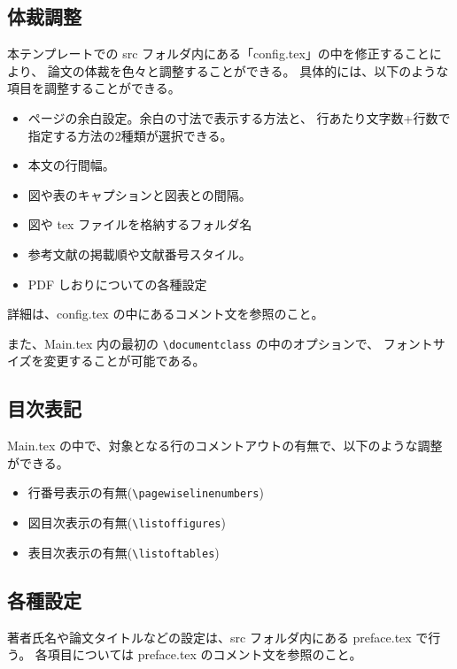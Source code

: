 \subsection{体裁調整}
本テンプレートでの src フォルダ内にある「config.tex」の中を修正することにより、
論文の体裁を色々と調整することができる。
具体的には、以下のような項目を調整することができる。
\begin{itemize}
 \item ページの余白設定。余白の寸法で表示する方法と、
	行あたり文字数+行数で指定する方法の2種類が選択できる。
 \item 本文の行間幅。
 \item 図や表のキャプションと図表との間隔。
 \item 図や tex ファイルを格納するフォルダ名
 \item 参考文献の掲載順や文献番号スタイル。
 \item PDF しおりについての各種設定
\end{itemize}
詳細は、config.tex の中にあるコメント文を参照のこと。

また、Main.tex 内の最初の \verb+\documentclass+ の中のオプションで、
フォントサイズを変更することが可能である。

\subsection{目次表記}
Main.tex の中で、対象となる行のコメントアウトの有無で、以下のような調整ができる。
\begin{itemize}
 \item 行番号表示の有無(\verb+\pagewiselinenumbers+)
 \item 図目次表示の有無(\verb+\listoffigures+)
 \item 表目次表示の有無(\verb+\listoftables+)
\end{itemize}

\subsection{各種設定}
著者氏名や論文タイトルなどの設定は、src フォルダ内にある preface.tex で行う。
各項目については preface.tex のコメント文を参照のこと。

